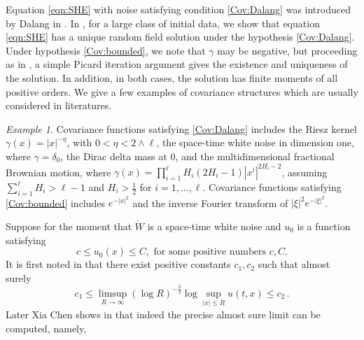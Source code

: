 \documentclass[12pt,reqno]{amsart}
\theoremstyle{remark}
\newtheorem{example}[theorem]{Example}
\newcommand{\1}{\mathbf{1}}
\begin{document}
	Equation \eqref{eqn:SHE} with noise satisfying condition \ref{Cov:Dalang} was introduced by Dalang in \cite{Dal}. In \cite{HLN15}, for a large class of initial data, we show that equation \eqref{eqn:SHE} has a unique random field solution under the hypothesis \ref{Cov:Dalang}. Under hypothesis \ref{Cov:bounded}, we note that $\gamma$ may be negative, but proceeding as in \cite{Huang}, a simple Picard iteration argument gives the existence and uniqueness of the solution. In addition, in both cases, the solution has finite moments of all positive orders. We give a  few examples of  covariance structures which are usually considered in literatures.
	\begin{example}\label{expl:cov1}
		Covariance functions satisfying \ref{Cov:Dalang} includes the Riesz kernel $\gamma(x)=|x|^{-\eta}$, with $0<\eta <2\wedge \ell$, the space-time white noise in dimension one, where $\gamma =\delta_0$, the Dirac delta mass at 0, and the multidimensional fractional Brownian motion, where $\gamma(x)= \prod_{i=1}^\ell H_i (2H_i-1) |x^i|^{2H_i-2}$, assuming $\sum_{i=1}^\ell H_i >\ell-1$ and $H_i >\frac 12$ for $i=1,\dots, \ell$. Covariance functions satisfying \ref{Cov:bounded} includes $e^{-|x|^2}$ and the inverse Fourier transform of $|\xi|^2 e^{-|\xi|^2}$. 
	\end{example}
	Suppose for the moment that $\dot{W}$ is a space-time white noise and $u_0$ is a function satisfying
	\begin{equation}\label{eq:u0 lower upper bd}
	 	c\le u_0(x)\le C,\mbox{ for some positive numbers } c,C.
	\end{equation} 
	It is first noted in \cite{MR3098071} that there exist positive constants $c_1,c_2$ such that almost surely
	\begin{equation}\label{eqn:cuC}
		c_1\le \limsup_{R\to\infty}(\log R)^{-\frac23}{\log\sup_{|x|\le R}u(t,x)} \le c_2\,.
	\end{equation}
	Later Xia Chen shows in \cite{MR3474477} that indeed the precise almost sure limit can be computed, namely, 
\end{document}
